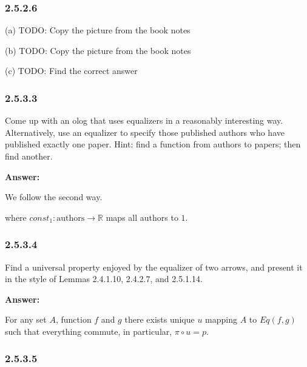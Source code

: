 \documentclass{article}
\newcommand{\Rational}{\mathbb{R}}
\newcommand{\vsp}[0]{\vspace*{10pt}\par}
\newcommand{\exercise}[1]{\subsubsection*{#1}}
\newcommand{\ans}[0]{\vsp\textbf{Answer: }\vsp}
\begin{document}
\exercise{2.5.2.6}

(a)
TODO: Copy the picture from the book notes

(b)
TODO: Copy the picture from the book notes

(c)
TODO: Find the correct answer


\exercise{2.5.3.3}

Come up with an olog that uses equalizers in a reasonably interesting way.
Alternatively, use an equalizer to specify those published authors who have
published exactly one paper. Hint: find a function from authors to papers; then
find another.

\ans

We follow the second way.

\begin{center}
\end{center}

where $const_1 : \text{authors} \to \Rational$ maps all authors to $1$.

\exercise{2.5.3.4}

Find a universal property enjoyed by the equalizer of two arrows, and present
it in the style of Lemmas 2.4.1.10, 2.4.2.7, and 2.5.1.14.

\ans

For any set $A$, function $f$ and $g$ there exists unique $u$ mapping $A$ to
$Eq(f,g)$ such that everything commute, in particular, $\pi \circ u = p$.

\begin{center}
\end{center}

\exercise{2.5.3.5}
\end{document}
